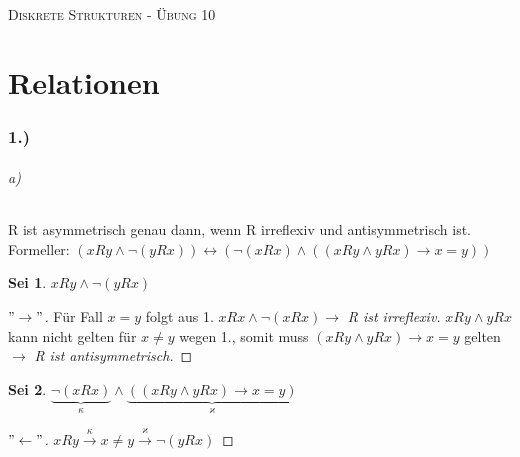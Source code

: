 \documentclass[titlepage]{article}
\theoremstyle{plain}
\newtheorem{theorem}{Sei}
\newcommand{\1}{\mathbb{1}}
\newcommand{\0}{\mathbb{0}}
\begin{document}
	
	\begin{center}
		\hrulefill\\
		\begin{center}
			\LARGE\textsc{Diskrete Strukturen - Übung 10} \normalsize\\
		\end{center}
		\hrulefill
		\date{\today}
	\end{center}
	
	\part*{Relationen}
	\section*{1.)}
		\paragraph{a)}R ist asymmetrisch genau dann, wenn R irreflexiv und antisymmetrisch ist. \\ Formeller: $(xRy\land\lnot(yRx))\leftrightarrow(\lnot(xRx)\land((xRy\land yRx)\rightarrow x=y))$
		\begin{theorem}
			$xRy\land\lnot(yRx)$
		\end{theorem}
		\begin{proof}[$"\rightarrow"$]
			Für Fall $x=y$ folgt aus 1. $xRx\land\lnot(xRx)\rightarrow$\textit{ R ist irreflexiv.}
			$xRy\land yRx$ kann nicht gelten für $x\neq y$ wegen 1., somit muss $(xRy\land yRx)\rightarrow x=y$ gelten $\rightarrow$\textit{ R ist antisymmetrisch.}
		\end{proof}
		\begin{theorem}
			$\underbrace{\lnot(xRx)}_{\kappa}\land\underbrace{((xRy\land yRx)\rightarrow x=y)}_{\varkappa}$
		\end{theorem}
		\begin{proof}[$"\leftarrow"$]
			$xRy\overset{\kappa}{\rightarrow} x\neq y\overset{\varkappa}{\rightarrow}\lnot(yRx)$
		\end{proof}
\end{document}
